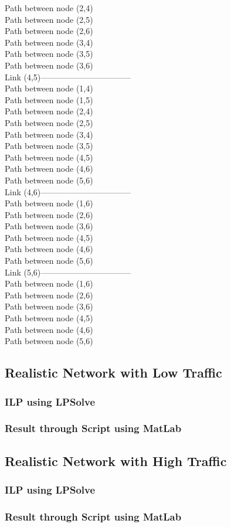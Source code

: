 Path between node (2,4)\\
Path between node (2,5)\\
Path between node (2,6)\\
Path between node (3,4)\\
Path between node (3,5)\\
Path between node (3,6)\\
Link (4,5)---------------------------------\\
Path between node (1,4)\\
Path between node (1,5)\\
Path between node (2,4)\\
Path between node (2,5)\\
Path between node (3,4)\\
Path between node (3,5)\\
Path between node (4,5)\\
Path between node (4,6)\\
Path between node (5,6)\\
Link (4,6)---------------------------------\\
Path between node (1,6)\\
Path between node (2,6)\\
Path between node (3,6)\\
Path between node (4,5)\\
Path between node (4,6)\\
Path between node (5,6)\\
Link (5,6)---------------------------------\\
Path between node (1,6)\\
Path between node (2,6)\\
Path between node (3,6)\\
Path between node (4,5)\\
Path between node (4,6)\\
Path between node (5,6)\\


\subsection{Realistic Network with Low Traffic}

\subsubsection{ILP using LPSolve}

\subsubsection{Result through Script using MatLab}

\subsection{Realistic Network with High Traffic}

\subsubsection{ILP using LPSolve}

\subsubsection{Result through Script using MatLab}

